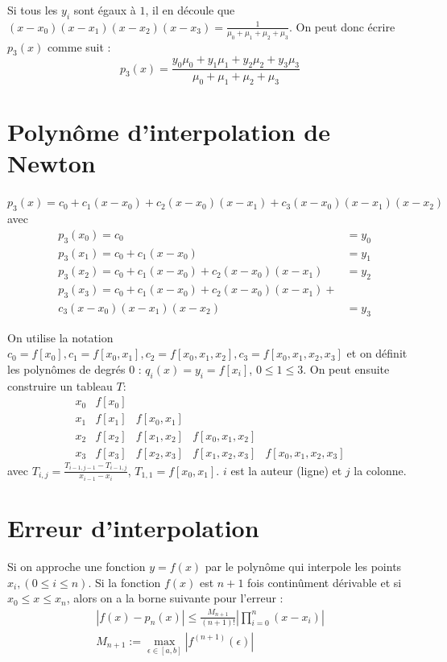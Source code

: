 \documentclass[a4paper,9pt]{extarticle}
\begin{document}
\begin{multicols*}{2}
Si tous les $y_i$ sont égaux à $1$, il en découle que $(x-x_0)(x-x_1)(x-x_2)(x-x_3)=\frac{1}{\mu_0+\mu_1+\mu_2+\mu_3}$. On peut donc écrire $p_3(x)$ comme suit :
$$
p_3(x) = \frac{y_0\mu_0+y_1\mu_1+y_2\mu_2+y_3\mu_3}{\mu_0+\mu_1+\mu_2+\mu_3}
$$

\section{Polynôme d'interpolation de Newton}

$p_3(x)=c_0+c_1(x-x_0)+c_2(x-x_0)(x-x_1)+c_3(x-x_0)(x-x_1)(x-x_2)$ avec
\begin{align*}
&p_3(x_0)=c_0 &=y_0\\
&p_3(x_1)=c_0+c_1(x-x_0) &=y_1\\
&p_3(x_2)=c_0+c_1(x-x_0)+c_2(x-x_0)(x-x_1) &=y_2\\
&p_3(x_3)=c_0+c_1(x-x_0)+c_2(x-x_0)(x-x_1)+\\&c_3(x-x_0)(x-x_1)(x-x_2) &=y_3
\end{align*}

On utilise la notation $c_0=f[x_0],c_1=f[x_0,x_1],c_2=f[x_0,x_1,x_2],c_3=f[x_0,x_1,x_2,x_3]$ et on définit les polynômes de degrés $0$ : $q_i(x)=y_i=f[x_i]$, $0\leq 1\leq 3$. On peut ensuite construire un tableau $T$:
$$
\begin{array}{c|cccc}
x_0 & f[x_0]\\
x_1 & f[x_1] & f[x_0,x_1]\\
x_2 & f[x_2] & f[x_1,x_2] & f[x_0,x_1,x_2]\\
x_3 & f[x_3] & f[x_2,x_3] & f[x_1,x_2,x_3] & f[x_0,x_1,x_2,x_3]
\end{array}
$$
avec $T_{i,j} = \frac{T_{i-1,j-1}-T_{i-1,j}}{x_{i-1}-x_{i}}$, \textbf{$T_{1,1}=f[x_0,x_1]$}. $i$ est la auteur (ligne) et $j$ la colonne.

\section{Erreur d'interpolation}

Si on approche une fonction $y=f(x)$ par le polynôme qui interpole les points $x_i,(0 \leq i \leq n)$. Si la fonction $f(x)$ est $n+1$ fois continûment dérivable et si $x_0 \leq x \leq x_n$, alors on a la borne suivante pour l'erreur : 
\begin{align*}
|f(x)-p_n(x)|\leq\frac{M_{n+1}}{(n+1)!}|\prod^n_{i=0}(x-x_i)|\\
M_{n+1} := \max_{\epsilon\in[a,b]}|f^{(n+1)}(\epsilon)|
\end{align*}


\end{multicols*}
\end{document}
